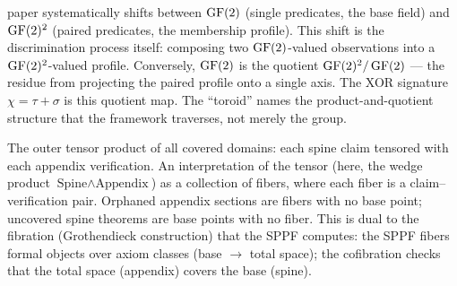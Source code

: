 \begin{description}[nosep,leftmargin=1.5cm]
    paper systematically shifts between $\operatorname{GF}(2)$ (single
    predicates, the base field) and $\operatorname{GF}(2)^2$ (paired
    predicates, the membership profile). This shift is
    the discrimination process itself: composing two
    $\operatorname{GF}(2)$-valued observations into a $\operatorname{GF}(2)^2$-valued
    profile. Conversely, $\operatorname{GF}(2)$ is the quotient
    $\operatorname{GF}(2)^2 / \operatorname{GF}(2)$ --- the residue from projecting
    the paired profile onto a single axis. The XOR
    signature $\chi = \tau + \sigma$ is this quotient map.
    The ``toroid'' names the product-and-quotient
    structure that the framework traverses, not merely
    the group.
  \item[Cofibration] The outer tensor product of all
    covered domains: each spine claim tensored with each
    appendix verification. An interpretation of the
    tensor (here, the wedge product $\text{Spine} \wedge
    \text{Appendix}$) as a collection of fibers, where
    each fiber is a claim--verification pair. Orphaned
    appendix sections are fibers with no base point;
    uncovered spine theorems are base points with no
    fiber. This is dual to the fibration (Grothendieck
    construction) that the SPPF computes: the SPPF
    fibers formal objects over axiom classes (base $\to$
    total space); the cofibration checks that the total
    space (appendix) covers the base (spine).
\end{description}
